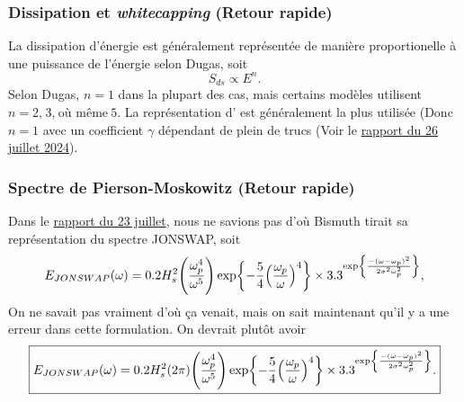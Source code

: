 \documentclass[10pt]{article}
\numberwithin{equation}{section}
\newcommand{\pt}{\hspace{1pt}} %
\begin{document}
\subsubsection{Dissipation et \emph{whitecapping} (Retour rapide)}
\label{sec:orgce77660}
La dissipation d'énergie est généralement représentée de manière proportionelle à une puissance de l'énergie selon Dugas, soit
\begin{equation}
   S_{ds} \propto E^n.
\end{equation}
Selon Dugas, \(n=1\) dans la plupart des cas, mais certains modèles utilisent \(n =2,\pt 3,\pt\text{où même}\ 5\).
La représentation d'\Textcite{hasselmann1974spectral} est généralement la plus utilisée (Donc \(n=1\) avec un coefficient \(\gamma\) dépendant de plein de trucs (Voir le \href{Fichiers\_pdf/rapport-2024-07-26.pdf}{rapport du 26 juillet 2024}).
\subsubsection{Spectre de Pierson-Moskowitz (Retour rapide)}
\label{sec:orgb65fff7}
Dans le \href{rapport-2024-08-23.pdf}{rapport du 23 juillet}, nous ne savions pas d'où Bismuth tirait sa représentation du spectre JONSWAP, soit
\begin{equation}
\label{eq:org797fb6c}
   E_{JONSWAP}(\omega) = 0.2H_s^2 \qty(\frac{\omega_p^4}{\omega^5}) \exp{-\frac{5}{4}\qty(\frac{\omega_p}{\omega})^4} \times 3.3^{\exp{\frac{-(\omega-\omega_p)^2}{2\sigma^2 \omega_p^2}}},
\end{equation}
On ne savait pas vraiment d'où ça venait, mais on sait maintenant qu'il y a une erreur dans cette formulation.
On devrait plutôt avoir
\begin{equation}
   \boxed{E_{JONSWAP}(\omega) = 0.2H_s^2 (2\pi) \qty(\frac{\omega_p^4}{\omega^5}) \exp{-\frac{5}{4}\qty(\frac{\omega_p}{\omega})^4} \times 3.3^{\exp{\frac{-(\omega-\omega_p)^2}{2\sigma^2 \omega_p^2}}}.}
\end{equation}
\end{document}
